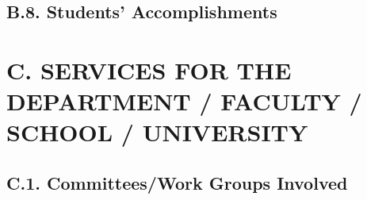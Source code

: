 \documentclass[10pt]{article}
\newcommand{\junk}[1]{}
\begin{document}




\subsection*{B.8. Students’ Accomplishments}



\junk{
\subsection*{B.9. Other Teaching-Related Activities}


}

\section*{C. SERVICES FOR THE DEPARTMENT / FACULTY / SCHOOL / UNIVERSITY}

\subsection*{C.1. Committees/Work Groups Involved}



\junk{
\subsection*{C.2. Other Duties Assigned by the University or Activities Carried Out for the University}



}
\end{document}
